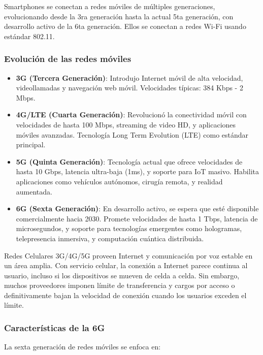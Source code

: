 Smartphones se conectan a redes móviles de múltiples generaciones, evolucionando desde la 3ra generación hasta la actual 5ta generación, con desarrollo activo de la 6ta generación. Ellos se conectan a redes Wi-Fi usando estándar 802.11. 

\subsubsection{Evolución de las redes móviles}

\begin{itemize}
    \item \textbf{3G (Tercera Generación)}: Introdujo Internet móvil de alta velocidad, videollamadas y navegación web móvil. Velocidades típicas: 384 Kbps - 2 Mbps.
    
    \item \textbf{4G/LTE (Cuarta Generación)}: Revolucionó la conectividad móvil con velocidades de hasta 100 Mbps, streaming de video HD, y aplicaciones móviles avanzadas. Tecnología Long Term Evolution (LTE) como estándar principal.
    
    \item \textbf{5G (Quinta Generación)}: Tecnología actual que ofrece velocidades de hasta 10 Gbps, latencia ultra-baja (1ms), y soporte para IoT masivo. Habilita aplicaciones como vehículos autónomos, cirugía remota, y realidad aumentada.
    
    \item \textbf{6G (Sexta Generación)}: En desarrollo activo, se espera que esté disponible comercialmente hacia 2030. Promete velocidades de hasta 1 Tbps, latencia de microsegundos, y soporte para tecnologías emergentes como hologramas, telepresencia inmersiva, y computación cuántica distribuida.
\end{itemize}

Redes Celulares 3G/4G/5G proveen Internet y comunicación por voz estable en un área amplia. Con servicio celular, la conexión a Internet parece continua al usuario, incluso si los dispositivos se mueven de celda a celda. Sin embargo, muchos proveedores imponen límite de transferencia y cargos por acceso o definitivamente bajan la velocidad de conexión cuando los usuarios exceden el límite.

\subsubsection{Características de la 6G}

La sexta generación de redes móviles se enfoca en:

